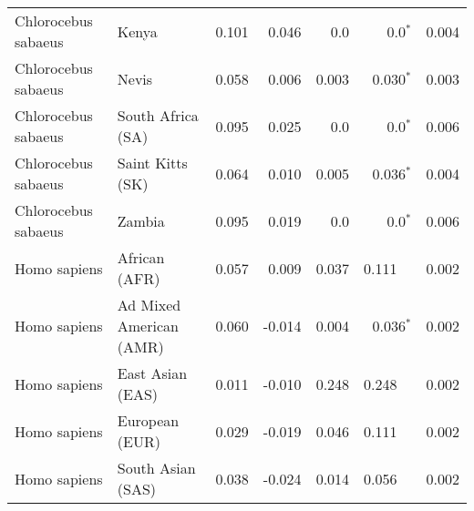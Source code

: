 \begin{center}
\begin{adjustbox}{width = 1\textwidth}
\begin{tabular}{|l|l|r|r|r|r|r|}
 Chlorocebus sabaeus &                           Kenya &                 0.101 &                                0.046 &                  0.0 &                             0.0$\bm{^*}$ &              0.004 \\
 Chlorocebus sabaeus &                           Nevis &                 0.058 &                                0.006 &                0.003 &                           0.030$\bm{^*}$ &              0.003 \\
 Chlorocebus sabaeus &               South Africa (SA) &                 0.095 &                                0.025 &                  0.0 &                             0.0$\bm{^*}$ &              0.006 \\
 Chlorocebus sabaeus &                Saint Kitts (SK) &                 0.064 &                                0.010 &                0.005 &                           0.036$\bm{^*}$ &              0.004 \\
 Chlorocebus sabaeus &                          Zambia &                 0.095 &                                0.019 &                  0.0 &                             0.0$\bm{^*}$ &              0.006 \\
        Homo sapiens &                   African (AFR) &                 0.057 &                                0.009 &                0.037 &                                  0.111~~ &              0.002 \\
        Homo sapiens &         Ad Mixed American (AMR) &                 0.060 &                               -0.014 &                0.004 &                           0.036$\bm{^*}$ &              0.002 \\
        Homo sapiens &                East Asian (EAS) &                 0.011 &                               -0.010 &                0.248 &                                  0.248~~ &              0.002 \\
        Homo sapiens &                  European (EUR) &                 0.029 &                               -0.019 &                0.046 &                                  0.111~~ &              0.002 \\
        Homo sapiens &               South Asian (SAS) &                 0.038 &                               -0.024 &                0.014 &                                  0.056~~ &              0.002 \\
\bottomrule
\end{tabular}
\end{adjustbox}
\end{center}
\newpage
